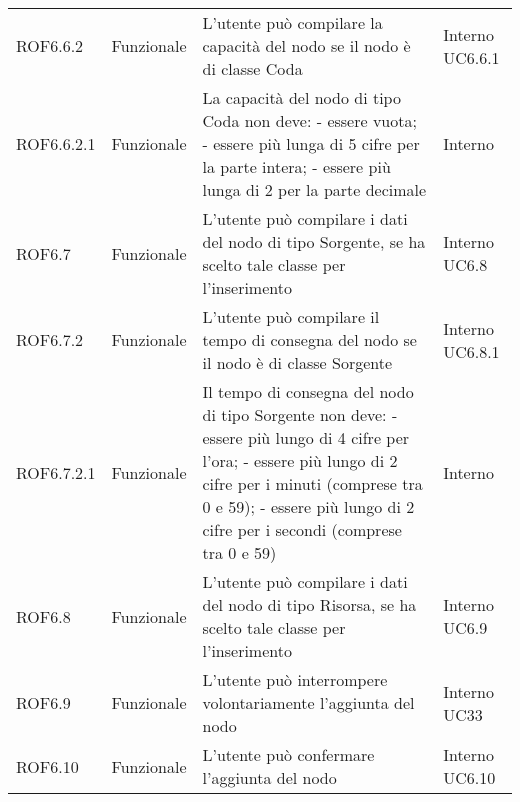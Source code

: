 \begin{longtable}{p{2cm}!{\VRule[1pt]}p{2cm}!{\VRule[1pt]}p{5cm}!{\VRule[1pt]}p{1.5cm}}
	\\
	ROF6.6.2                         & Funzionale\newline               & L'utente può compilare la capacità del nodo se il nodo è di classe Coda                                                & Interno \newline UC6.6.1     
	\\
	ROF6.6.2.1&Funzionale\newline  & La capacità del nodo di tipo Coda non deve:
	- essere vuota;
	- essere più lunga di 5 cifre per la parte intera;
	- essere più lunga di 2 per la parte decimale & Interno \\
	ROF6.7                           & Funzionale\newline               & L'utente può compilare i dati del nodo di tipo Sorgente, se ha scelto tale classe per l'inserimento                      & Interno \newline UC6.8       
	\\
	ROF6.7.2                         & Funzionale\newline               & L'utente può compilare il tempo di consegna del nodo se il nodo è di classe Sorgente                                    & Interno \newline UC6.8.1     
	\\
	ROF6.7.2.1&Funzionale\newline  & Il tempo di consegna del nodo di tipo Sorgente non deve:
	- essere più lungo di 4 cifre per l'ora;
	- essere più lungo di 2 cifre per i minuti (comprese tra 0 e 59);
	- essere più lungo di 2 cifre per i secondi (comprese tra 0 e 59) & Interno \\
	ROF6.8                           & Funzionale\newline               & L'utente può compilare i dati del nodo di tipo Risorsa, se ha scelto tale classe per l'inserimento                       & Interno \newline UC6.9       
	\\
	ROF6.9                           & Funzionale\newline               & L'utente può interrompere volontariamente l'aggiunta del nodo                                                            & Interno \newline UC33        
	\\
		ROF6.10                          & Funzionale\newline               & L'utente può confermare l'aggiunta del nodo                                                                              & Interno \newline UC6.10      

\end{longtable}
